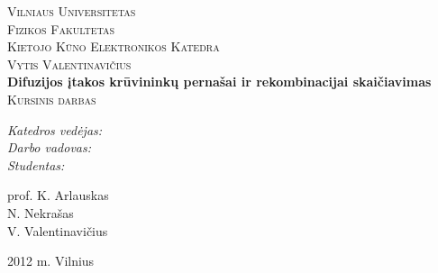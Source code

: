 \begin{titlepage}

\begin{center}



\textsc{\LARGE Vilniaus Universitetas} \\
\textsc{\LARGE Fizikos Fakultetas} \\
\textsc{\LARGE Kietojo Kūno Elektronikos Katedra}\\[2cm]

\textsc{\Large Vytis Valentinavičius}\\[1.5cm]




{ \huge \bfseries Difuzijos įtakos krūvininkų pernašai ir rekombinacijai skaičiavimas}\\[1cm]

\textsc{\Large Kursinis darbas}\\[2cm]

\begin{minipage}{0.4\textwidth}
\begin{flushleft} \large
\emph{Katedros vedėjas:} \\
\emph{Darbo vadovas:} \\
\emph{Studentas:} \\
\end{flushleft}
\end{minipage}
\begin{minipage}{0.4\textwidth}
\begin{flushright} \large
prof. K. Arlauskas \\
N. Nekrašas \\
V. Valentinavičius \\
\end{flushright}
\end{minipage}



\vfill

{\large 2012 m. Vilnius}

\end{center}

\end{titlepage}